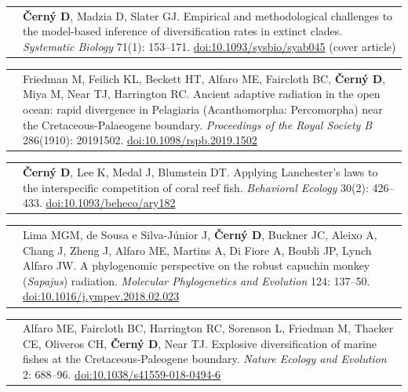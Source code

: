 \documentclass[10pt]{article}
\begin{document}
\begin{tabularx}{\textwidth}{>{\raggedleft\arraybackslash}p{2.2cm} X}
2021 & \textbf{\v{C}ern\'{y} D}, Madzia D, Slater GJ. Empirical and methodological challenges to the model-based inference of diversification rates in extinct clades. \textit{Systematic Biology} 71(1): 153--171. \href{http://doi.org/10.1093/sysbio/syab045}{doi:10.1093/sysbio/syab045} (cover article)
\end{tabularx}
\begin{tabularx}{\textwidth}{>{\raggedleft\arraybackslash}p{2.2cm} p{10.5cm}}
2019 & Friedman M, Feilich KL, Beckett HT, Alfaro ME, Faircloth BC, \textbf{\v{C}ern\'{y} D}, Miya M, Near TJ, Harrington RC. Ancient adaptive radiation in the open ocean: rapid divergence in Pelagiaria (Acanthomorpha: Percomorpha) near the Cretaceous-Palaeogene boundary. \textit{Proceedings of the Royal Society B} 286(1910): 20191502. \href{http://doi.org/10.1098/rspb.2019.1502}{doi:10.1098/rspb.2019.1502}
\end{tabularx}
\begin{tabularx}{\textwidth}{>{\raggedleft\arraybackslash}p{2.2cm} p{10.5cm}}
2018 & \textbf{\v{C}ern\'{y} D}, Lee K, Medal J, Blumstein DT. Applying Lanchester's laws to the interspecific competition of coral reef fish. \textit{Behavioral Ecology} 30(2): 426--433. \href{http://doi.org/10.1093/beheco/ary182}{doi:10.1093/beheco/ary182}
\end{tabularx}
\begin{tabularx}{\textwidth}{>{\raggedleft\arraybackslash}p{2.2cm} X}
2018 & Lima MGM, de Sousa e Silva-J\'{u}nior J, \textbf{\v{C}ern\'{y} D}, Buckner JC, Aleixo A, Chang J, Zheng J, Alfaro ME, Martins A, Di Fiore A, Boubli JP, Lynch Alfaro JW. A phylogenomic perspective on the robust capuchin monkey (\textit{Sapajus}) radiation. \textit{Molecular Phylogenetics and Evolution} 124: 137--50. \href{http://doi.org/10.1016/j.ympev.2018.02.023}{doi:10.1016/j.ympev.2018.02.023}
\end{tabularx}
\begin{tabularx}{\textwidth}{>{\raggedleft\arraybackslash}p{2.2cm} X}
2018 & Alfaro ME, Faircloth BC, Harrington RC, Sorenson L, Friedman M, Thacker CE, Oliveros CH, \textbf{\v{C}ern\'{y} D}, Near TJ. Explosive diversification of marine fishes at the Cretaceous-Paleogene boundary. \textit{Nature Ecology and Evolution} 2: 688--96. \href{http://doi.org/10.1038/s41559-018-0494-6}{doi:10.1038/s41559-018-0494-6}
\end{tabularx}
\end{document}
